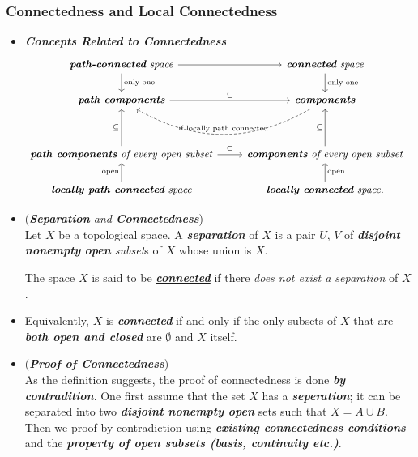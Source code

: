 \documentclass[11pt]{article}
\begin{document}
\subsubsection{Connectedness and Local Connectedness}
\begin{itemize}
\item  \emph{\textbf{Concepts Related to Connectedness}}
\[
  \begin{tikzcd}
 \text{\emph{\textbf{path-connected} space}}  \arrow{d}{\text{only one}}   \arrow{r}{} &  \text{\emph{\textbf{connected} space}}  \arrow{d}{\text{only one}} \\
   \text{\emph{\textbf{path components}}}   \arrow{r}{\subseteq }  &\arrow[l, swap, bend left, dashed, "\text{if locally path connected}"]  \text{\emph{\textbf{components}}}\\
   & & \\
   \text{\emph{\textbf{path components} of every open subset}}   \arrow{r}{\subseteq } \arrow{uu}{\subseteq } & \text{\emph{\textbf{components}  of every open subset}} \arrow{uu}{\subseteq }\\
  \text{\emph{\textbf{locally path connected} space}} \arrow[u, "\text{open}"]  & \text{\emph{\textbf{locally connected} space}} \arrow[u, swap, "\text{open}"].
  \end{tikzcd}
\] 

\item \begin{definition}(\emph{\textbf{Separation} and \textbf{Connectedness}})\\
Let $X$ be a topological space. A \emph{\textbf{separation}} of $X$ is a pair $U$, $V$ of \emph{\textbf{disjoint} \textbf{nonempty} \textbf{open} subset}s of $X$ whose union is $X$. 

The space $X$ is said to be \underline{\emph{\textbf{connected}}} if there \emph{does not exist a separation} of $X$.
\end{definition}

\item  \begin{definition} 
Equivalently, $X$ is \emph{\textbf{connected}} if and only if the only subsets of $X$ that are \emph{\textbf{both open and closed}} are $\emptyset$
and $X$ itself.
\end{definition}

\item \begin{remark} (\emph{\textbf{Proof of Connectedness}})\\
As the definition suggests, the proof of connectedness is done \emph{\textbf{by contradition}}. One first assume that the set $X$ has a \emph{\textbf{seperation}}; it can be separated into two \emph{\textbf{disjoint nonempty open}} sets such that $X = A \cup B$. Then we proof by contradiction using \emph{\textbf{existing connectedness conditions}} and the \emph{\textbf{property of open subsets (basis, continuity etc.)}}.
\end{remark}


\end{itemize}
\end{document}
